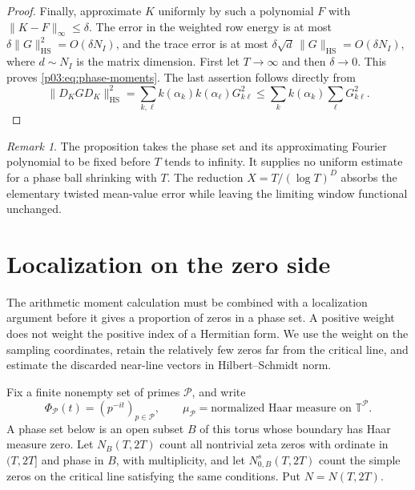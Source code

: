 \documentclass[11pt,letterpaper]{article}
\theoremstyle{definition}
\theoremstyle{remark}
\newtheorem{remark}[theorem]{Remark}
\newcommand{\T}{\mathbb T}
\newcommand{\1}{\mathbf 1}
\begin{document}
\begin{proof}
Finally, approximate $K$ uniformly by such a polynomial $F$ with
$\|K-F\|_\infty\le\delta$. The error in the weighted row energy
is at most $\delta\|G\|_{\mathrm{HS}}^2=O(\delta N_I)$, and the
trace error is at most
$\delta\sqrt d\,\|G\|_{\mathrm{HS}}=O(\delta N_I)$, where
$d\sim N_I$ is the matrix dimension. First let $T\to\infty$ and
then $\delta\to0$. This proves \eqref{p03:eq:phase-moments}.
The last assertion follows directly from
\[
 \|D_KGD_K\|_{\mathrm{HS}}^2
 =\sum_{k,\ell}k(\alpha_k)k(\alpha_\ell)G_{k\ell}^2
 \le\sum_k k(\alpha_k)\sum_\ell G_{k\ell}^2.
\]
\end{proof}

\begin{remark}\label{p03:rem:phase-fixed-scope}
The proposition takes the phase set and its approximating Fourier
polynomial to be fixed before $T$ tends to infinity. It supplies no
uniform estimate for a phase ball shrinking with $T$. The reduction
$X=T/(\log T)^D$ absorbs the elementary twisted mean-value error
while leaving the limiting window functional unchanged.
\end{remark}




\section{Localization on the zero side}
\label{p03:sec:phase-zero-localization}

The arithmetic moment calculation must be combined with a localization
argument before it gives a proportion of zeros in a phase set.  A
positive weight does not weight the positive index of a Hermitian form.
We use the weight on the sampling coordinates, retain the relatively
few zeros far from the critical line, and estimate the discarded
near-line vectors in Hilbert--Schmidt norm.

Fix a finite nonempty set of primes $\mathcal P$, and write
\[
 \Phi_{\mathcal P}(t)=(p^{-it})_{p\in\mathcal P},\qquad
 \mu_{\mathcal P}=\text{normalized Haar measure on }\T^{\mathcal P}.
\]
A phase set below is an open subset $B$ of this torus whose boundary
has Haar measure zero.  Let $N_B(T,2T)$ count all nontrivial zeta zeros
with ordinate in $(T,2T]$ and phase in $B$, with multiplicity, and let
$N^s_{0,B}(T,2T)$ count the simple zeros on the critical line satisfying
the same conditions.  Put $N=N(T,2T)$.
\end{document}
